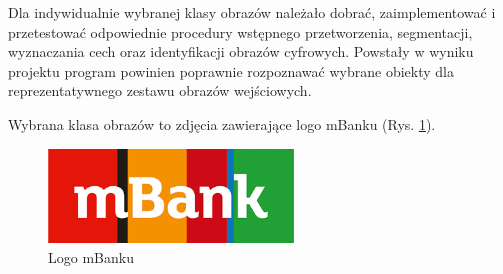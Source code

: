 Dla indywidualnie wybranej klasy obrazów należało dobrać, zaimplementować i przetestować odpowiednie procedury wstępnego przetworzenia, segmentacji, wyznaczania cech oraz identyfikacji obrazów cyfrowych. Powstały w wyniku projektu program powinien poprawnie rozpoznawać wybrane obiekty dla reprezentatywnego zestawu obrazów wejściowych.

Wybrana klasa obrazów to zdjęcia zawierające logo mBanku (Rys. \ref{fig:logo_main}).

\begin{figure}[h]
    \centering
    \includegraphics[height=2.5cm]{figures/mBank_logo_main.png}
    \caption{Logo mBanku}
    \label{fig:logo_main}
\end{figure}